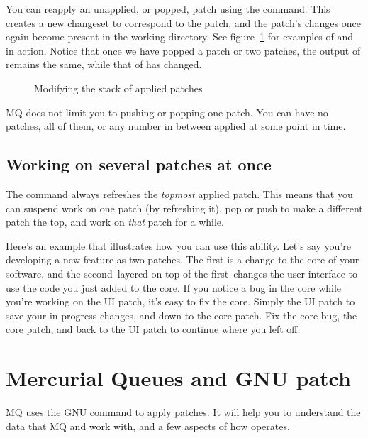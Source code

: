 You can reapply an unapplied, or popped, patch using the 
command.  This creates a new changeset to correspond to the patch, and
the patch's changes once again become present in the working
directory.  See figure~\ref{ex:mq:qpop} for examples of 
and  in action.  Notice that once we have popped a patch
or two patches, the output of  remains the same, while
that of  has changed.

\begin{figure}[ht]
  \caption{Modifying the stack of applied patches}
  \label{ex:mq:qpop}
\end{figure}

MQ does not limit you to pushing or popping one patch.  You can have
no patches, all of them, or any number in between applied at some
point in time.

\subsection{Working on several patches at once}

The  command always refreshes the \emph{topmost}
applied patch.  This means that you can suspend work on one patch (by
refreshing it), pop or push to make a different patch the top, and
work on \emph{that} patch for a while.

Here's an example that illustrates how you can use this ability.
Let's say you're developing a new feature as two patches.  The first
is a change to the core of your software, and the second--layered on
top of the first--changes the user interface to use the code you just
added to the core.  If you notice a bug in the core while you're
working on the UI patch, it's easy to fix the core.  Simply
 the UI patch to save your in-progress changes, and
 down to the core patch.  Fix the core bug,
 the core patch, and  back to the UI
patch to continue where you left off.

\section{Mercurial Queues and GNU patch}
\label{sec:mq:patch}

MQ uses the GNU  command to apply patches.  It will
help you to understand the data that MQ and  work with,
and a few aspects of how  operates.

